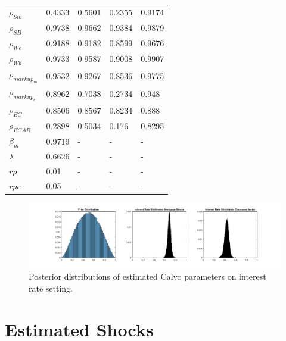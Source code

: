 \documentclass[12pt]{article}
\numberwithin{equation}{section}
\begin{document}
\begin{table}[H]
\begin{tabular}{l||llll}
$\rho_{Sm}$ & 0.4333 & 0.5601 & 0.2355 & 0.9174 \\
$\rho_{SB}$ & 0.9738 & 0.9662 & 0.9384 & 0.9879 \\
$\rho_{We}$ & 0.9188 & 0.9182 & 0.8599 & 0.9676 \\
$\rho_{Wb}$ & 0.9733 & 0.9587 & 0.9008 & 0.9907 \\
$\rho_{markup_m}$ & 0.9532 & 0.9267 & 0.8536 & 0.9775 \\
$\rho_{markup_e}$ & 0.8962 & 0.7038 & 0.2734 & 0.948 \\
$\rho_{EC}$ & 0.8506 & 0.8567 & 0.8234 & 0.888 \\
$\rho_{ECAB}$ & 0.2898 & 0.5034 & 0.176 & 0.8295\\
$\beta_m$ & 0.9719 & - & - & -\\
$\lambda$ & 0.6626 & - & - & -\\
$rp$ & 0.01 & - & - & -\\
$rpe$ & 0.05 & - & - & -\\
\end{tabular}
\end{table}


\begin{figure}[H]
\caption{Posterior distributions of estimated Calvo parameters on interest rate setting.}
\includegraphics[scale=0.5]{posteriordistributions_calvo2.pdf}
\end{figure}


\section*{Estimated Shocks}
\end{document}
